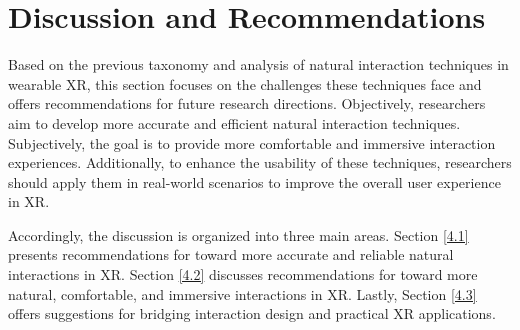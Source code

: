 \documentclass[review]{fcs}
\begin{document}
\section{Discussion and Recommendations}

Based on the previous taxonomy and analysis of natural interaction techniques in wearable XR, this section focuses on the challenges these techniques face and offers recommendations for future research directions. Objectively, researchers aim to develop more accurate and efficient natural interaction techniques. Subjectively, the goal is to provide more comfortable and immersive interaction experiences. Additionally, to enhance the usability of these techniques, researchers should apply them in real-world scenarios to improve the overall user experience in XR.

Accordingly, the discussion is organized into three main areas. Section \ref{4.1} presents recommendations for toward more accurate and reliable natural interactions in XR. Section \ref{4.2} discusses recommendations for toward more natural, comfortable, and immersive interactions in XR. Lastly, Section \ref{4.3} offers suggestions for bridging interaction design and practical XR applications.

\end{document}
